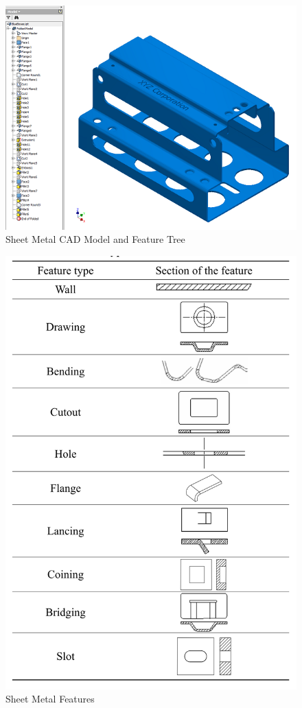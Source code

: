 	\begin{figure}[!h]
	\centering
	\includegraphics[width=\linewidth]{images/blueboxes}
	\caption{Sheet Metal CAD Model and Feature Tree}
	\label{fig_ariplainpair}
	\end{figure}

	\begin{figure}[!h]
	\centering
	\includegraphics[width=0.5\linewidth]{images/liuFeatures}
	\caption{Sheet Metal Features}
	\label{fig_smtaxonomy}
	\end{figure}

